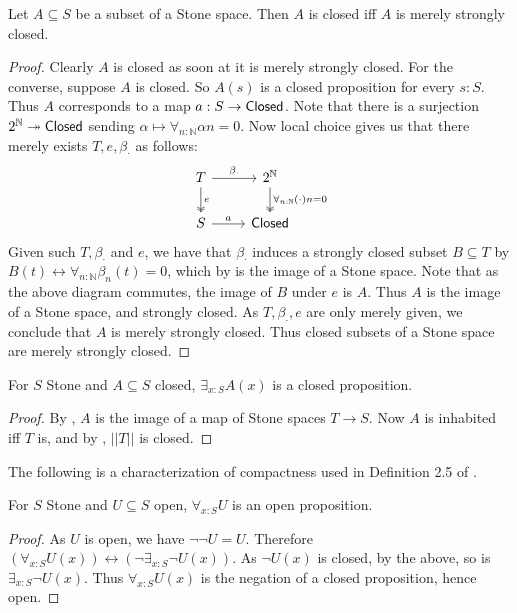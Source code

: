 \begin{lemma}
  Let $A\subseteq S$ be a subset of a Stone space. Then 
    $A$ is closed iff $A$ is merely strongly closed. 
\end{lemma}
\begin{proof}
  Clearly $A$ is closed as soon at it is merely strongly closed. 
  For the converse, suppose $A$ is closed. 
  So $A(s)$ is a closed proposition for every $s:S$. 
  Thus $A$ corresponds to a map $a:S\to \mathsf{Closed}$. 
%
  Note that there is a surjection $2^\mathbb N \twoheadrightarrow \mathsf{Closed}$ sending 
  $\alpha \mapsto \forall_{n:\mathbb N} \alpha n = 0. $
  Now local choice gives us that there merely exists $T, e, \beta_\cdot$ as follows:
  \begin{equation}
    \begin{tikzcd}
      T \arrow[r,"\beta_\cdot"] \arrow[d, two heads,"e"] & 2^\mathbb N 
      \arrow[d,two heads, "\forall_{n:\mathbb N} (\cdot)n = 0"] \\
      S \arrow[r,"a"] & \Closed
    \end{tikzcd} 
  \end{equation} 
  Given such $T,\beta_\cdot $ and $e$, we have that 
  $\beta_\cdot$ induces a strongly closed subset $B\subseteq T$ by 
  $B(t) \leftrightarrow \forall_{n:\mathbb N} \beta_n(t) = 0$, which by 
   is the image of a Stone space. 
  Note that as the above diagram commutes, the image of $B$ under $e$ is $A$.
  Thus $A$ is the image of a Stone space, and strongly closed. 
  As $T,\beta_\cdot, e$ are only merely given, we conclude that $A$ is merely strongly closed. 
  Thus closed subsets of a Stone space are merely strongly closed. 
\end{proof}

\begin{corollary}
  For $S$ Stone and $A\subseteq S$ closed, $\exists_{x:S} A(x)$ is a closed proposition. 
\end{corollary}
\begin{proof}
  By , $A$ is the image of a map of Stone spaces $T\to S$.
  Now $A$ is inhabited iff $T$ is, and by , $||T||$ is closed. 
\end{proof} 
The following is a characterization of compactness used in Definition 2.5 of \cite{SyntheticTopology}.
\begin{corollary}
  For $S$ Stone and $U\subseteq S$ open, $\forall_{x:S} U$ is an open proposition. 
\end{corollary}
\begin{proof}
  As $U$ is open, we have $\neg \neg U = U$. 
  Therefore $(\forall_{x:S} U(x)) \leftrightarrow (\neg \exists_{x:S} \neg U(x))$. 
  As $\neg U(x)$ is closed, by the above, so is $\exists_{x:S} \neg U(x)$. 
  Thus $\forall_{x:S} U(x)$ is the negation of a closed proposition, hence open. 
\end{proof}
